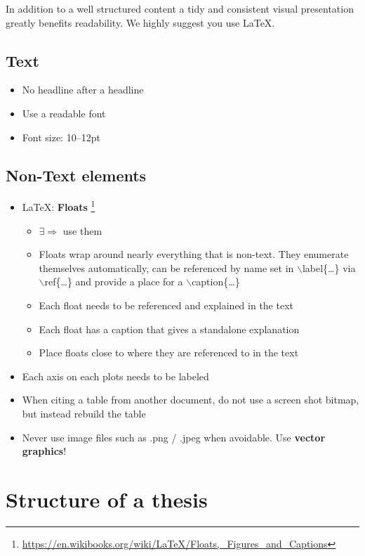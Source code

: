 \documentclass[logo, twocolumn]{mlai-report}
\begin{document}
In addition to a well structured content a tidy and consistent visual presentation greatly benefits readability. We highly suggest you use \LaTeX.

\subsection{Text}
\begin{itemize}
	\item No headline after a headline
	\item Use a readable font
	\item Font size: 10--12pt
\end{itemize}

\subsection{Non-Text elements}

\begin{itemize}
	\item \LaTeX: \textbf{Floats} \footnote{\href{https://en.wikibooks.org/wiki/LaTeX/Floats,_Figures_and_Captions}{https://en.wikibooks.org/wiki/LaTeX/Floats,\_Figures\_and\_Captions}}
	\begin{itemize}
		\item $\exists \Rightarrow$ use them
		\item Floats wrap around nearly everything that is non-text. They enumerate themselves automatically, can be referenced by name set in $\backslash$label\{\dots\} via $\backslash $ref\{\dots\} and provide a place for a $\backslash$caption\{\dots\}
		\item Each float needs to be referenced and explained in the text
		\item Each float has a caption that gives a standalone explanation
		\item Place floats close to where they are referenced to in the text
	\end{itemize}
	\item Each axis on each plots needs to be labeled
	\item When citing a table from another document, do not use a screen shot bitmap, but instead rebuild the table 
	\item Never use image files such as .png / .jpeg when avoidable. Use \textbf{vector graphics}!
\end{itemize}

\section{Structure of a thesis} \label{sec:structure}
\end{document}
